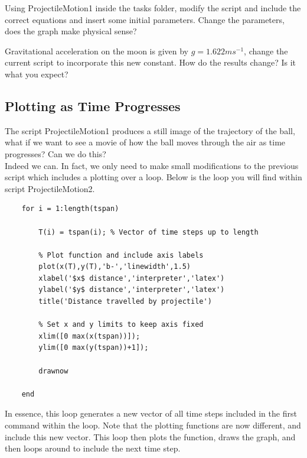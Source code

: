 \documentclass[12pt]{report}
\begin{document}
\begin{tcolorbox}[title=Task (Moderate)]
Using ProjectileMotion1 inside the tasks folder, modify the script and include the correct equations and insert some initial parameters. Change the parameters, does the graph make physical sense?
\end{tcolorbox}

\begin{tcolorbox}[title=Task (Easy)]
Gravitational acceleration on the moon is given by $g = 1.622ms^{-1}$, change the current script to incorporate this new constant. How do the results change? Is it what you expect?
\end{tcolorbox}

\subsection*{Plotting as Time Progresses}
The script ProjectileMotion1 produces a still image of the trajectory of the ball, what if we want to see a movie of how the ball moves through the air as time progresses? Can we do this?\\

\noindent Indeed we can. In fact, we only need to make small modifications to the previous script which includes a plotting over a loop. Below is the loop you will find within script ProjectileMotion2.

\begin{lstlisting}
    for i = 1:length(tspan)
    
        T(i) = tspan(i); % Vector of time steps up to length
        
        % Plot function and include axis labels
        plot(x(T),y(T),'b-','linewidth',1.5)
        xlabel('$x$ distance','interpreter','latex')
        ylabel('$y$ distance','interpreter','latex')
        title('Distance travelled by projectile')
        
        % Set x and y limits to keep axis fixed
        xlim([0 max(x(tspan))]); 
        ylim([0 max(y(tspan))+1]);
        
        drawnow
        
    end
\end{lstlisting}

\noindent In essence, this loop generates a new vector of all time steps included in the first command within the loop. Note that the plotting functions are now different, and include this new vector. This loop then plots the function, draws the graph, and then loops around to include the next time step.\\
\end{document}
